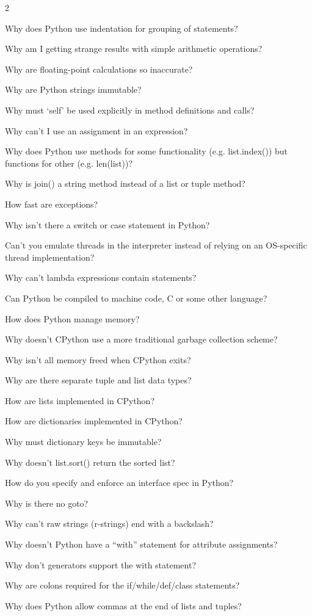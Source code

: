 \documentclass [8pt] {extarticle}
\begin{document}
    \begin {multicols} {2}

        Why does Python use indentation for grouping of statements?

        Why am I getting strange results with simple arithmetic operations?

        Why are floating-point calculations so inaccurate?

        Why are Python strings immutable?

        Why must ‘self’ be used explicitly in method definitions and calls?

        Why can’t I use an assignment in an expression?

        Why does Python use methods for some functionality (e.g. list.index()) but functions for other (e.g. len(list))?

        Why is join() a string method instead of a list or tuple method?

        How fast are exceptions?

        Why isn’t there a switch or case statement in Python?

        Can’t you emulate threads in the interpreter instead of relying on an OS-specific thread implementation?

        Why can’t lambda expressions contain statements?

        Can Python be compiled to machine code, C or some other language?

        How does Python manage memory?

        Why doesn’t CPython use a more traditional garbage collection scheme?

        Why isn’t all memory freed when CPython exits?

        Why are there separate tuple and list data types?

        How are lists implemented in CPython?

        How are dictionaries implemented in CPython?

        Why must dictionary keys be immutable?

        Why doesn’t list.sort() return the sorted list?

        How do you specify and enforce an interface spec in Python?

        Why is there no goto?

        Why can’t raw strings (r-strings) end with a backslash?

        Why doesn’t Python have a “with” statement for attribute assignments?

        Why don’t generators support the with statement?

        Why are colons required for the if/while/def/class statements?

        Why does Python allow commas at the end of lists and tuples?
    \end {multicols}
\end{document}
